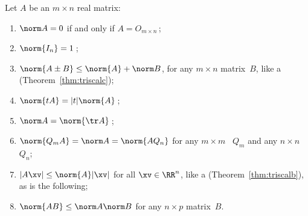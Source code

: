 \begin{theorem} \label{thm:norm} 
Let \(A\) be an \(m\times n\) real matrix:
\begin{enumerate}
\item\label{thm:norm:iii} \(\norm A=0\) if and only if \(A=O_{m\times n}\)\,;
\item\label{thm:norm:vi} \(\norm{I_n}=1\)\,;
\item\label{thm:norm:iv} \(\norm {A\pm B}\leq\norm{A}+\norm B\), for any \(m\times n\) matrix~\(B\), like a  (Theorem~\ref{thm:triscalc});
\item\label{thm:norm:v} \(\norm{tA}=|t|\norm{A}\)\,;
\item\label{thm:norm:i} \(\norm A=\norm{\tr A}\)\,;
\item\label{thm:norm:ii} \(\norm{Q_mA}=\norm A=\norm{AQ_n}\) for any \(m\times m\) ~\(Q_m\) and any  \(n\times n\) ~\(Q_n\);
\item\label{thm:norm:viii} \(|A\xv|\leq\norm{A}|\xv|\) for all \(\xv\in\RR^n\), like a  (Theorem~\ref{thm:triscalb}), as is the following;
\item\label{thm:norm:vii} \(\norm{AB}\leq\norm A\norm B\) for any \(n\times p\) matrix~\(B\).
\end{enumerate}
\end{theorem}
